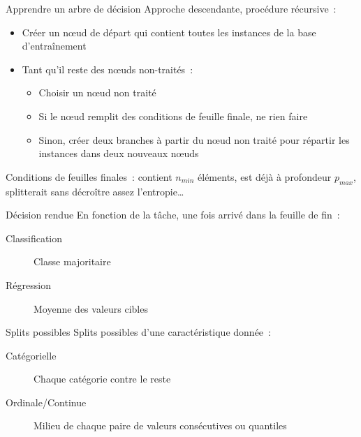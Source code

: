 \begin{frame}{Apprendre un arbre de décision}
  Approche descendante, procédure récursive~:

  \begin{itemize}
    \item Créer un nœud de départ qui contient toutes les instances de la base d'entraînement
    \item Tant qu'il reste des nœuds non-traités~:
      \begin{itemize}
        \item Choisir un nœud non traité
        \item Si le nœud remplit des conditions de feuille finale, ne rien faire
        \item Sinon, créer deux branches à partir du nœud non traité pour répartir les instances dans deux nouveaux nœuds
      \end{itemize}
  \end{itemize}

  Conditions de feuilles finales~: contient $n_{min}$ éléments, est déjà à profondeur $p_{max}$, splitterait sans décroître assez l'entropie…
\end{frame}

\begin{frame}{Décision rendue}
  En fonction de la tâche, une fois arrivé dans la feuille de fin~:

  \begin{description}
  \item[Classification] Classe majoritaire
  \item[Régression] Moyenne des valeurs cibles
  \end{description}
\end{frame}

\begin{frame}{Splits possibles}
  Splits possibles d'une caractéristique donnée~:
  \begin{description}
    \item[Catégorielle] Chaque catégorie contre le reste
    \item[Ordinale/Continue] Milieu de chaque paire de valeurs consécutives ou quantiles
  \end{description}
\end{frame}
